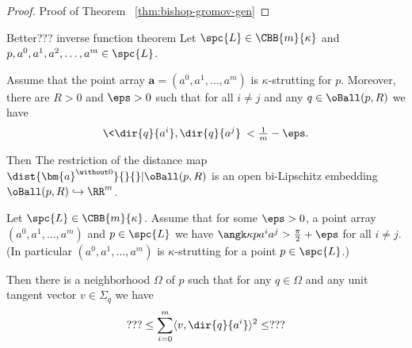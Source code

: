 \begin{proof}{Proof of Theorem ~\ref{thm:bishop-gromov-gen}}
\begin{comment}
Thus,
\[
|\nabla_x f|=\snk(\dist{x}{S}{}) \eqlbl{eq:grad-length}
\]

for all $x\in T$ and \ref{eq:grad-length} almost holds for points near $T$ (to be made precise...)

Therefore  gradient curves of $f$ passing through points of $T$ are parts of reparametrized geodesics of length $R$ starting at $S$ and ending at $\Sphere[S,R]$. 


Let $\tau$ be such that $\GF^\tau_{\tilde f} (\Sphere [\tilde p, r])=\Sphere [\tilde p, R]$.
More explicitly, $\tau$ is defined by

\[
\mdk(R)-\mdk(r)=\int\limits_0^\tau (\mdk(t)')^2\d t=\int_0^\tau (\snk(t))^2\d t
\]


\end{proof}

\end{comment}

\end{proof}



















\begin{thm}{Better??? inverse function theorem}
Let $\spc{L}\in\CBB{m}{\kappa}$ 
and $p,a^0,a^1,a^2,\dots,a^m\in\spc{L}$.

Assume that the point array $\bm{a}=(a^0,a^1,\dots,a^m)$ is $\kappa$-strutting for $p$.
Moreover,
there are $R>0$ and $\eps>0$ such that
for all $i\not=j$ and any $q\in\oBall(p,R)$ we have
\[\<\dir{q}{a^i},\dir{q}{a^j}\>
<\tfrac1m-\eps.\]

Then 
The restriction of the distance map 
$\dist{\bm{a}^{\without 0}}{}{}|\oBall(p,R)$
is an open bi-Lipschitz embedding $\oBall(p,R)\hookrightarrow\RR^m$.

\end{thm}

Let $\spc{L}\in \CBB{m}{\kappa}$.
Assume that for some $\eps>0$,
a point array
$(a^0,a^1,\dots,a^m)$ 
and $p\in\spc{L}$
we have $\angk\kappa p {a^i}{a^j}>\tfrac\pi2+\eps$ for all $i\ne j$.
(In particular $(a^0,a^1,\dots,a^m)$ is $\kappa$-strutting for a point $p\in\spc{L}$.)

Then there is a neighborhood $\Omega$ of $p$
such that for any $q\in\Omega$
and any unit tangent vector $v\in \Sigma_q$
we have
\[???\le\sum_{i=0}^m\langle v,\dir{q}{a^i}\rangle^2\le ???\]

















